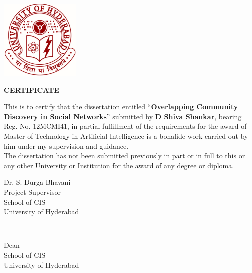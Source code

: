 {
\thispagestyle{empty}
\begin{center}
{ \includegraphics[width=1.5in]{./figures/uohyd.jpg}}

\textbf{\large CERTIFICATE}  
\end{center}
\vspace{.50in}
This is to certify that the dissertation entitled ``\textbf{Overlapping Community Discovery in Social Networks}'' submitted by \textbf{D Shiva Shankar}, bearing Reg. No. 12MCMI41, 
in partial fulfillment of the requirements for the award of Master of Technology in Artificial Intelligence 
is a bonafide work carried out by him under my supervision and guidance. \\

The dissertation has not been submitted previously in part or in full to this or any other University 
or Institution for the award of any degree or diploma.

\vspace{1in}
\noindent


\parbox[t]{3in}{\flushleft 
Dr. S. Durga Bhavani\\
Project Supervisor\\
School of CIS\\
University of Hyderabad\\}\\
\parbox[t]{3in}{ 
\vspace{1in}
Dean\\
School of CIS\\
University of Hyderabad\\}

}
